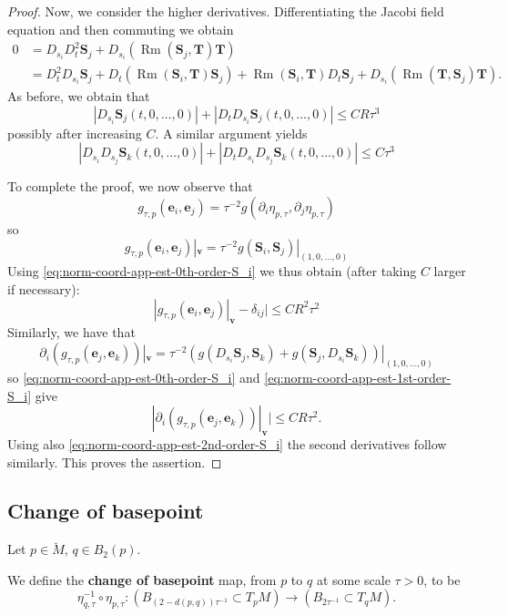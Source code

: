 \documentclass[11pt, letterpaper, reqno]{amsart}
\numberwithin{equation}{section}
\theoremstyle{remark}
\newcommand{\mbfS}{\mathbf{S}}
\newcommand{\mbfT}{\mathbf{T}}
\newcommand{\mbfe}{\mathbf{e}}
\newcommand{\mbfv}{\mathbf{v}}
\newcommand{\Rm}{\operatorname{Rm}}
\begin{document}
\begin{proof}
Now, we consider the higher derivatives. Differentiating the Jacobi field equation and then commuting we obtain
\begin{align*}
0 & = D_{s_i} D^2_t\mbfS_j + D_{s_i}(\Rm(\mbfS_j,\mbfT)\mbfT)\\
& = D_t^2D_{s_i} \mbfS_j  + D_t(\Rm(\mbfS_i,\mbfT)\mbfS_j) + \Rm(\mbfS_i,\mbfT)D_t\mbfS_j+ D_{s_i}(\Rm(\mbfT,\mbfS_j)\mbfT). 
\end{align*}
As before, we obtain that 
\begin{equation}\label{eq:norm-coord-app-est-1st-order-S_i}
|D_{s_i}\mbfS_j(t,0,\dots,0)|+|D_tD_{s_i}\mbfS_j(t,0,\dots,0)|\leq CR \tau^3
\end{equation}
possibly after increasing $C$. A similar argument yields
\begin{equation}\label{eq:norm-coord-app-est-2nd-order-S_i}
|D_{s_i}D_{s_j}\mbfS_k(t,0,\dots,0)|+|D_tD_{s_i}D_{s_j}\mbfS_k(t,0,\dots,0)|\leq C \tau^3
\end{equation}

To complete the proof, we now observe that
\[
g_{\tau,p}(\mbfe_i,\mbfe_j) = \tau^{-2}g(\partial_i\eta_{p,\tau},\partial_j\eta_{p,\tau})
\]
so
\[
g_{\tau,p}(\mbfe_i,\mbfe_j)|_{\mbfv} = \tau^{-2}g(\mbfS_i,\mbfS_j)|_{(1,0,\dots,0)}
\]
Using \eqref{eq:norm-coord-app-est-0th-order-S_i} we thus obtain (after taking $C$ larger if necessary):
\[
|g_{\tau,p}(\mbfe_i,\mbfe_j)|_{\mbfv} - \delta_{ij}| \leq C R^2 \tau^2
\]
Similarly, we have that
\[
\partial_i (g_{\tau,p}(\mbfe_j,\mbfe_k)) |_{\mbfv} = \tau^{-2}(g(D_{s_i}\mbfS_j,\mbfS_k) + g(\mbfS_j,D_{s_i}\mbfS_k))|_{(1,0,\dots,0)}
\]
so \eqref{eq:norm-coord-app-est-0th-order-S_i} and \eqref{eq:norm-coord-app-est-1st-order-S_i} give
\[
|\partial_i (g_{\tau,p}(\mbfe_j,\mbfe_k)) |_{\mbfv}| \leq C R \tau^2. 
\]
Using also \eqref{eq:norm-coord-app-est-2nd-order-S_i} the second derivatives follow similarly. This proves the assertion. 
\end{proof}

\subsection{Change of basepoint} Let $p \in \breve M$, $q \in B_2(p)$.

We define the \textbf{change of basepoint} map, from $p$ to $q$ at some scale $\tau > 0$, to be
\begin{equation}\label{eq:cob-map}
\eta_{q,\tau}^{-1} \circ \eta_{p,\tau}  : (B_{(2-d(p,q))\tau^{-1}} \subset T_p M) \to (B_{2\tau^{-1}} \subset T_q M).
\end{equation}
\end{document}
